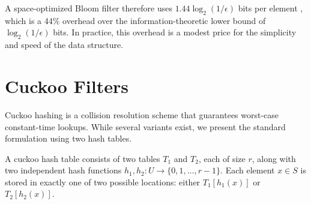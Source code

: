 A space-optimized Bloom filter therefore uses $1.44 \log_2(1/\epsilon)$ bits 
per element \cite{mitzenmacher, cuckoo}, which is a 44\% overhead over the 
information-theoretic lower bound of $\log_2(1/\epsilon)$ bits. In practice, 
this overhead is a modest price for the simplicity and speed of the data 
structure.

\section{Cuckoo Filters}

Cuckoo hashing is a collision resolution scheme that guarantees worst-case 
constant-time lookups. While several variants exist, we present the standard 
formulation using two hash tables.

A cuckoo hash table consists of two tables $T_1$ and $T_2$, each of size $r$, 
along with two independent hash functions $h_1, h_2 : U \to \{0, 1, \ldots, r-1\}$. 
Each element $x \in S$ is stored in exactly one of two possible locations: 
either $T_1[h_1(x)]$ or $T_2[h_2(x)]$.


